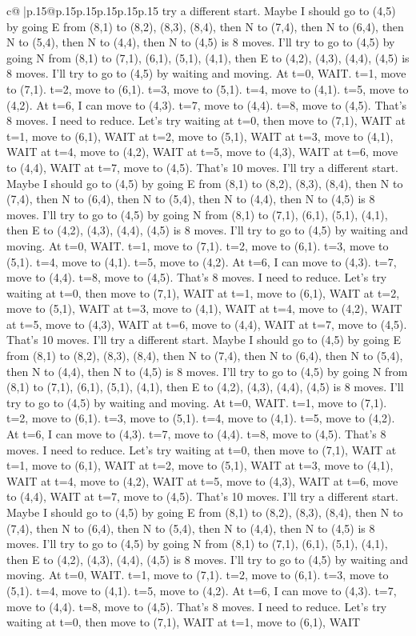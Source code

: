 \documentclass{article}
\begin{document}
{\begin{supertabular}{c@{$\;$}|p{.15\linewidth}@{}p{.15\linewidth}p{.15\linewidth}p{.15\linewidth}p{.15\linewidth}p{.15\linewidth}}
{{{try a different start. Maybe I should go to (4,5) by going E from (8,1) to (8,2), (8,3), (8,4), then N to (7,4), then N to (6,4), then N to (5,4), then N to (4,4), then N to (4,5) is 8 moves. I'll try to go to (4,5) by going N from (8,1) to (7,1), (6,1), (5,1), (4,1), then E to (4,2), (4,3), (4,4), (4,5) is 8 moves. I'll try to go to (4,5) by waiting and moving. At t=0, WAIT. t=1, move to (7,1). t=2, move to (6,1). t=3, move to (5,1). t=4, move to (4,1). t=5, move to (4,2). At t=6, I can move to (4,3). t=7, move to (4,4). t=8, move to (4,5). That's 8 moves. I need to reduce. Let's try waiting at t=0, then move to (7,1), WAIT at t=1, move to (6,1), WAIT at t=2, move to (5,1), WAIT at t=3, move to (4,1), WAIT at t=4, move to (4,2), WAIT at t=5, move to (4,3), WAIT at t=6, move to (4,4), WAIT at t=7, move to (4,5). That's 10 moves. I'll try a different start. Maybe I should go to (4,5) by going E from (8,1) to (8,2), (8,3), (8,4), then N to (7,4), then N to (6,4), then N to (5,4), then N to (4,4), then N to (4,5) is 8 moves. I'll try to go to (4,5) by going N from (8,1) to (7,1), (6,1), (5,1), (4,1), then E to (4,2), (4,3), (4,4), (4,5) is 8 moves. I'll try to go to (4,5) by waiting and moving. At t=0, WAIT. t=1, move to (7,1). t=2, move to (6,1). t=3, move to (5,1). t=4, move to (4,1). t=5, move to (4,2). At t=6, I can move to (4,3). t=7, move to (4,4). t=8, move to (4,5). That's 8 moves. I need to reduce. Let's try waiting at t=0, then move to (7,1), WAIT at t=1, move to (6,1), WAIT at t=2, move to (5,1), WAIT at t=3, move to (4,1), WAIT at t=4, move to (4,2), WAIT at t=5, move to (4,3), WAIT at t=6, move to (4,4), WAIT at t=7, move to (4,5). That's 10 moves. I'll try a different start. Maybe I should go to (4,5) by going E from (8,1) to (8,2), (8,3), (8,4), then N to (7,4), then N to (6,4), then N to (5,4), then N to (4,4), then N to (4,5) is 8 moves. I'll try to go to (4,5) by going N from (8,1) to (7,1), (6,1), (5,1), (4,1), then E to (4,2), (4,3), (4,4), (4,5) is 8 moves. I'll try to go to (4,5) by waiting and moving. At t=0, WAIT. t=1, move to (7,1). t=2, move to (6,1). t=3, move to (5,1). t=4, move to (4,1). t=5, move to (4,2). At t=6, I can move to (4,3). t=7, move to (4,4). t=8, move to (4,5). That's 8 moves. I need to reduce. Let's try waiting at t=0, then move to (7,1), WAIT at t=1, move to (6,1), WAIT at t=2, move to (5,1), WAIT at t=3, move to (4,1), WAIT at t=4, move to (4,2), WAIT at t=5, move to (4,3), WAIT at t=6, move to (4,4), WAIT at t=7, move to (4,5). That's 10 moves. I'll try a different start. Maybe I should go to (4,5) by going E from (8,1) to (8,2), (8,3), (8,4), then N to (7,4), then N to (6,4), then N to (5,4), then N to (4,4), then N to (4,5) is 8 moves. I'll try to go to (4,5) by going N from (8,1) to (7,1), (6,1), (5,1), (4,1), then E to (4,2), (4,3), (4,4), (4,5) is 8 moves. I'll try to go to (4,5) by waiting and moving. At t=0, WAIT. t=1, move to (7,1). t=2, move to (6,1). t=3, move to (5,1). t=4, move to (4,1). t=5, move to (4,2). At t=6, I can move to (4,3). t=7, move to (4,4). t=8, move to (4,5). That's 8 moves. I need to reduce. Let's try waiting at t=0, then move to (7,1), WAIT at t=1, move to (6,1), WAIT }}}
\end{supertabular}}
\end{document}
